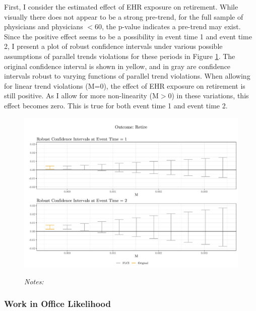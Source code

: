 \documentclass[12pt]{article}
\begin{document}
First, I consider the estimated effect of EHR exposure on retirement. While visually there does not appear to be a strong pre-trend, for the full sample of physicians and physicians $< 60$, the p-value indicates a pre-trend may exist. Since the positive effect seems to be a possibility in event time 1 and event time 2, I present a plot of robust confidence intervals under various possible assumptions of parallel trends violations for these periods in Figure \ref{fig:pre_retire}. The original confidence interval is shown in yellow, and in gray are confidence intervals robust to varying functions of parallel trend violations. When allowing for linear trend violations (M=0), the effect of EHR exposure on retirement is still positive. As I allow for more non-linearity (M$>$0) in these variations, this effect becomes zero. This is true for both event time 1 and event time 2. 

\begin{figure}[ht]
    \centering
    \captionsetup{width=.5\linewidth}
    \caption{}
    \includegraphics[scale=.5]{Objects/retire_pretrends_plot.pdf}
    \label{fig:pre_retire}
    \vspace{2mm}
    \caption*{\footnotesize{\textit{Notes:}}}
\end{figure}

\subsubsection{Work in Office Likelihood}
\end{document}
